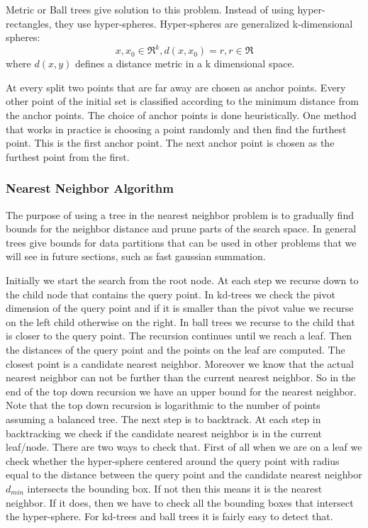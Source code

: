 \documentclass[12pt,letterpaper,doublespaced,ETD,dvips,proposal]{gtthesis}
\begin{document}
\begin{Body}
Metric or Ball trees \cite{moore2000ahu} give solution to this problem. Instead of using
hyper-rectangles, they use hyper-spheres. Hyper-spheres are
generalized k-dimensional spheres:
\begin{equation}
x,x_0 \in \Re^k , d(x,x_0)=r, r\in \Re
\end{equation}
where $d(x, y)$ defines a distance metric in a k dimensional space.

At every split two points that are far away are chosen as anchor
points. Every other point of the initial set is classified according
to the minimum distance from the anchor points. The choice of anchor
points is done heuristically. One method that works in practice is
choosing a point randomly and then find the furthest point. This is
the first anchor point. The next anchor point is chosen as the
furthest point from the first.

\subsubsection{Nearest Neighbor Algorithm}
The purpose of using a tree in the nearest neighbor problem is to
gradually find bounds for the neighbor distance and prune parts of
the search space. In general trees give bounds for data partitions
that can be used in other problems that we will see in future
sections, such as fast gaussian summation.

Initially we start the search from the root node. At each step we
 recurse down to the child node that contains the query point.
In kd-trees we check the pivot dimension of the query point and if
it is smaller than the pivot value we recurse on the left child
otherwise on the right. In ball trees we recurse to the child that
is closer to the query point. The recursion continues until we reach
a leaf. Then the distances of the query point and the points on the
leaf are computed. The closest point is a candidate nearest
neighbor. Moreover we know that the actual nearest neighbor can not
be further than the current nearest neighbor. So in the end of the
top down recursion we have an upper bound for the nearest neighbor.
Note that the top down recursion is logarithmic to the number of
points assuming a balanced tree. The next step is to backtrack. At
each step in backtracking we check if the candidate nearest neighbor
is in the current leaf/node. There are two ways to check that. First
of all when we are on a leaf we check whether the hyper-sphere
centered around the query point with radius equal to the distance
 between the query point and the candidate nearest neighbor
 $d_{min}$ intersects the bounding box. If not then this means it is
 the nearest neighbor. If it does, then we have to check all the
 bounding boxes that intersect the hyper-sphere. For kd-trees and
 ball trees it is fairly easy to detect that.


\end{Body}
\end{document}
